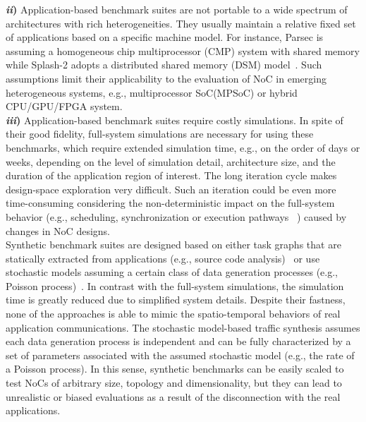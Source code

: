 \noindent \textbf{\textit{ii})} Application-based benchmark suites are not portable to a wide spectrum of architectures with rich heterogeneities. They usually maintain a relative fixed set of applications based on a specific machine model. For instance, Parsec is assuming a homogeneous chip multiprocessor (CMP) system with shared memory while Splash-2 adopts a distributed shared memory (DSM) model~\cite{bienia2008parsec}. Such assumptions limit their applicability to the evaluation of NoC in emerging heterogeneous systems, e.g., multiprocessor SoC(MPSoC) or hybrid CPU/GPU/FPGA system.\\
\noindent \textbf{\textit{iii})} Application-based benchmark suites require costly simulations. In spite of their good fidelity, full-system simulations are necessary for using these benchmarks, which require extended simulation time, e.g., on the order of days or weeks, depending on the level of simulation detail, architecture size, and the duration of the application region of interest. The long iteration cycle makes design-space exploration very difficult. Such an iteration could be even more time-consuming considering the non-deterministic impact on the full-system behavior (e.g., scheduling, synchronization or execution pathways ~\cite{alameldeen2003variability}) caused by changes in NoC designs.\\
\indent Synthetic benchmark suites are designed based on either task graphs that are statically extracted from applications (e.g., source code analysis)~\cite{pekkarinen2011set} or use stochastic models assuming a certain class of data generation processes (e.g., Poisson process)~\cite{dally2004principles}. In contrast with the full-system simulations, the simulation time is greatly reduced due to simplified system details. Despite their fastness, none of the approaches is able to mimic the spatio-temporal behaviors of real application communications. The stochastic model-based traffic synthesis assumes each data generation process is independent and can be fully characterized by a set of parameters associated with the assumed stochastic model (e.g., the rate of a Poisson process). In this sense, synthetic benchmarks can be easily scaled to test NoCs of arbitrary size, topology and dimensionality, but they can lead to unrealistic or biased evaluations as a result of the disconnection with the  real applications.\\
